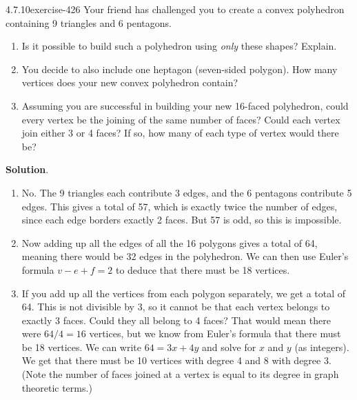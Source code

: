 \documentclass[twoside,11pt,]{book}
\numberwithin{equation}{chapter}
\begin{document}
\begin{divisionsolution}{4.7.10}{}{exercise-426}%
\hypertarget{p-4952}{}%
Your friend has challenged you to create a convex polyhedron containing 9 triangles and 6 pentagons.\leavevmode%
\begin{enumerate}[label=(\alph*)]
\item\hypertarget{li-2382}{}\hypertarget{p-4953}{}%
Is it possible to build such a polyhedron using \emph{only} these shapes? Explain.%
\item\hypertarget{li-2383}{}\hypertarget{p-4954}{}%
You decide to also include one heptagon (seven-sided polygon). How many vertices does your new convex polyhedron contain?%
\item\hypertarget{li-2384}{}\hypertarget{p-4955}{}%
Assuming you are successful in building your new 16-faced polyhedron, could every vertex be the joining of the same number of faces? Could each vertex join either 3 or 4 faces? If so, how many of each type of vertex would there be?%
\end{enumerate}
%
\par\smallskip%
\noindent\textbf{Solution}.\quad%
\hypertarget{p-4956}{}%
\leavevmode%
\begin{enumerate}[label=(\alph*)]
\item\hypertarget{li-2385}{}\hypertarget{p-4957}{}%
No. The 9 triangles each contribute 3 edges, and the 6 pentagons contribute 5 edges. This gives a total of 57, which is exactly twice the number of edges, since each edge borders exactly 2 faces. But 57 is odd, so this is impossible.%
\item\hypertarget{li-2386}{}\hypertarget{p-4958}{}%
Now adding up all the edges of all the 16 polygons gives a total of 64, meaning there would be 32 edges in the polyhedron. We can then use Euler's formula \(v - e + f = 2\) to deduce that there must be 18 vertices.%
\item\hypertarget{li-2387}{}\hypertarget{p-4959}{}%
If you add up all the vertices from each polygon separately, we get a total of 64. This is not divisible by 3, so it cannot be that each vertex belongs to exactly 3 faces. Could they all belong to 4 faces? That would mean there were \(64/4 = 16\) vertices, but we know from Euler's formula that there must be 18 vertices. We can write \(64 = 3x + 4y\) and solve for \(x\) and \(y\) (as integers). We get that there must be 10 vertices with degree 4 and 8 with degree 3. (Note the number of faces joined at a vertex is equal to its degree in graph theoretic terms.)%
\end{enumerate}
%
\end{divisionsolution}%
\end{document}
